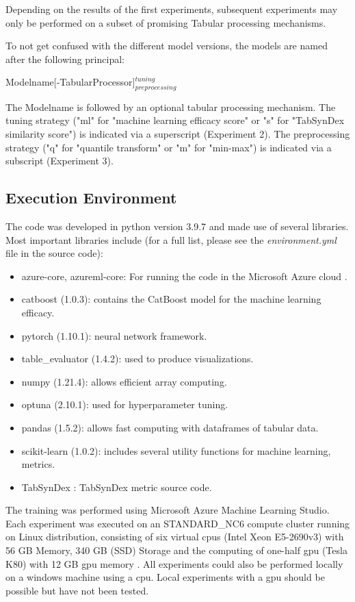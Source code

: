 Depending on the results of the first experiments, subsequent experiments may only be performed on a subset of promising Tabular processing mechanisms.

To not get confused with the different model versions, the models are named after the following principal:

Modelname[-TabularProcessor]$^{tuning}_{preprocessing}$

The Modelname is followed by an optional tabular processing mechanism.
The tuning strategy ("ml" for "machine learning efficacy score" or "s" for "TabSynDex similarity score") is indicated via a superscript (Experiment 2).
The preprocessing strategy ("q" for "quantile transform" or "m" for "min-max") is indicated via a subscript (Experiment 3).

\subsection{Execution Environment}
\label{ch:environment}

The code was developed in python version 3.9.7 and made use of several libraries.
Most important libraries include (for a full list, please see the \textit{environment.yml} file in the source code):
\begin{itemize}
	\item azure-core, azureml-core: For running the code in the Microsoft Azure cloud \cite{microsoftCloudComputingServices}.
	\item catboost (1.0.3): contains the CatBoost model for the machine learning efficacy.
	\item pytorch (1.10.1): neural network framework.
	\item table\_evaluator (1.4.2): used to produce visualizations.
	\item numpy (1.21.4): allows efficient array computing.
	\item optuna (2.10.1): used for hyperparameter tuning.
	\item pandas (1.5.2): allows fast computing with dataframes of tabular data.
	\item scikit-learn (1.0.2): includes several utility functions for machine learning, \eg metrics.
	\item TabSynDex \cite{chundawatTabSynDexCode}: TabSynDex metric source code.
\end{itemize}

The training was performed using Microsoft Azure Machine Learning Studio.
Each experiment was executed on an STANDARD\_NC6 compute cluster running on Linux distribution, consisting of six virtual \glspl{cpu} (Intel Xeon E5-2690v3) with 56 GB Memory, 340 GB (SSD) Storage and the computing of one-half \gls{gpu} (Tesla K80) with 12 GB \gls{gpu} memory \cite{vikancha-msft2022NCseriesAzureVirtual}.
All experiments could also be performed locally on a windows machine using a \gls{cpu}.
Local experiments with a \gls{gpu} should be possible but have not been tested.

